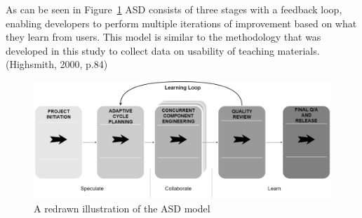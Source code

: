As can be seen in Figure~\ref{asd} ASD consists of three stages with a feedback loop, enabling developers to perform multiple iterations of improvement based on what they learn from users. This model is similar to the methodology that was developed in this study to collect data on usability of teaching materials. (Highsmith, 2000, p.84)


\begin{figure}
\hspace*{-1cm}
\centering
\includegraphics[scale=0.25]{figure/asd.png}
\caption{A redrawn illustration of the ASD model} %
\label{asd}
\end{figure}


